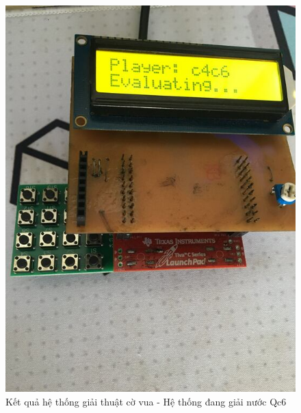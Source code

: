 \begin{figure}[ht]
\centering
\includegraphics[scale=0.3]{images/chess_c4c6.jpg}
\caption{Kết quả hệ thống giải thuật cờ vua - Hệ thống đang giải nước Qc6}
\label{fig:chess_c4c6}
\end{figure}

